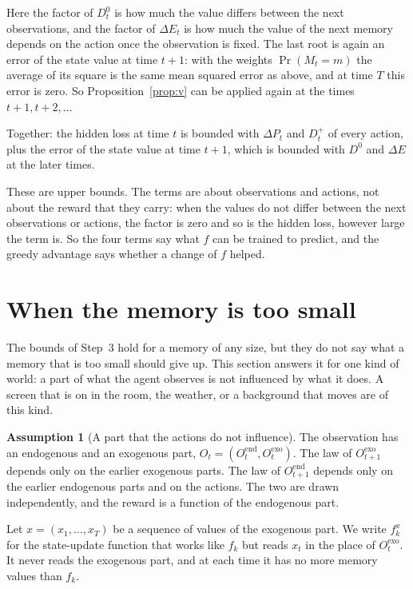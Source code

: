 \documentclass[11pt]{article}
\theoremstyle{definition}
\newtheorem{assumption}{Assumption}
\newcommand{\dE}{\Delta E}
\newcommand{\dP}{\Delta P}
\begin{document}
Here the factor of $D^0_t$ is how much the value differs between the next observations, and the factor of $\dE_t$ is how much the value of the next memory depends on the action once the observation is fixed. The last root is again an error of the state value at time $t+1$: with the weights $\Pr(M_t=m)$ the average of its square is the same mean squared error as above, and at time $T$ this error is zero. So Proposition~\ref{prop:v} can be applied again at the times $t+1,t+2,\dots$

Together: the hidden loss at time $t$ is bounded with $\dP_t$ and $D^+_t$ of every action, plus the error of the state value at time $t+1$, which is bounded with $D^0$ and $\dE$ at the later times.

These are upper bounds. The terms are about observations and actions, not about the reward that they carry: when the values do not differ between the next observations or actions, the factor is zero and so is the hidden loss, however large the term is. So the four terms say what $f$ can be trained to predict, and the greedy advantage says whether a change of $f$ helped.

\section{When the memory is too small}\label{sec:capacity}

The bounds of Step~3 hold for a memory of any size, but they do not say what a memory that is too small should give up. This section answers it for one kind of world: a part of what the agent observes is not influenced by what it does. A screen that is on in the room, the weather, or a background that moves are of this kind.

\begin{assumption}[A part that the actions do not influence]\label{as:exo}
The observation has an endogenous and an exogenous part, $O_t=(O^{\mathrm{end}}_t,O^{\mathrm{exo}}_t)$. The law of $O^{\mathrm{exo}}_{t+1}$ depends only on the earlier exogenous parts. The law of $O^{\mathrm{end}}_{t+1}$ depends only on the earlier endogenous parts and on the actions. The two are drawn independently, and the reward is a function of the endogenous part.
\end{assumption}

Let $x=(x_1,\dots,x_T)$ be a sequence of values of the exogenous part. We write $f_k^{x}$ for the state-update function that works like $f_k$ but reads $x_t$ in the place of $O^{\mathrm{exo}}_t$. It never reads the exogenous part, and at each time it has no more memory values than $f_k$.
\end{document}
